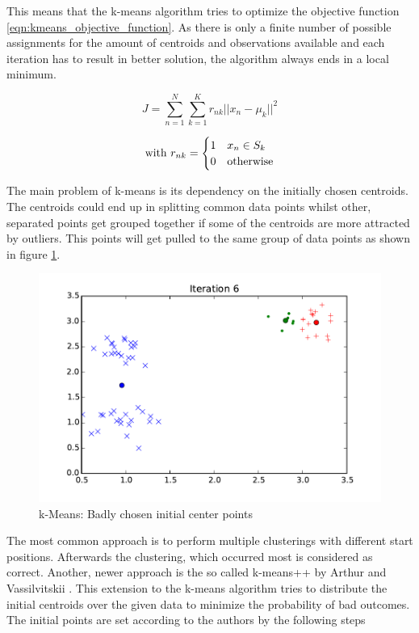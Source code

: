 This means that the k-means algorithm tries to optimize the objective function \ref{eqn:kmeans_objective_function}. As there is only a finite number of possible assignments for the amount of centroids and observations available and each iteration has to result in better solution, the algorithm always ends in a local minimum.

\begin{equation}
J = \sum_{n=1}^{N} \sum_{k=1}^{K} r_{nk} ||x_n - \mu_k||^2
\label{eqn:kmeans_objective_function}
\end{equation}

\[
\text{with } \\
r_{nk} = \begin{cases}
1 & x_n \in S_k \\
0 & \text{otherwise}
\end{cases}
\]


The main problem of k-means is its dependency on the initially chosen centroids. The centroids could end up in splitting common data points whilst other, separated points get grouped together if some of the centroids are more attracted by outliers. This points will get pulled to the same group of data points as shown in figure \ref{fig:kmeans_bad}.


\begin{figure}[h]
\centering
\includegraphics[width=0.6\linewidth]{img/kmeans_bad}
\caption{k-Means: Badly chosen initial center points}
\label{fig:kmeans_bad}
\end{figure}

The most common approach is to perform multiple clusterings with different start positions. Afterwards the clustering, which occurred most is considered as correct. Another, newer approach is the so called k-means++ by Arthur and Vassilvitskii \cite{Arthur}. This extension to the k-means algorithm tries to distribute the initial centroids over the given data to minimize the probability of bad outcomes. The initial points are set according to the authors by the following steps

